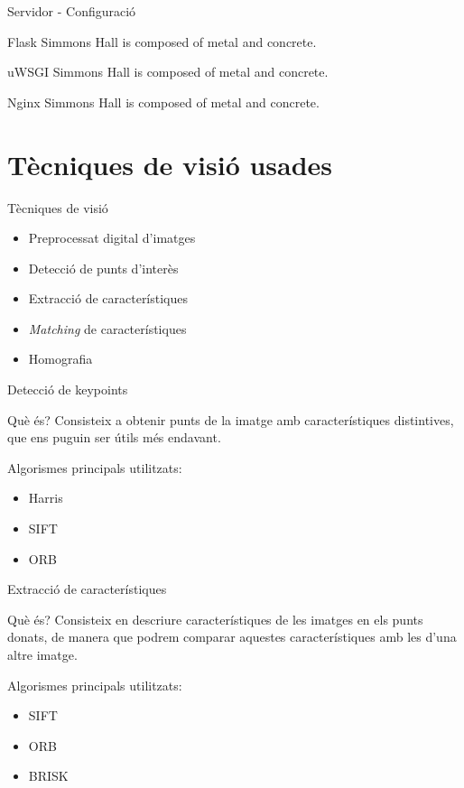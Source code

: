 \documentclass[xcolor=table, 11pt]{beamer}
\newcommand\tz{\fontsize{13}{15.6}\selectfont}
\begin{document}
	\begin{frame}{Servidor - Configuració}
		\tz
		\begin{alertblock}{Flask}
			Simmons Hall is composed of metal and concrete.
		\end{alertblock}
		\begin{alertblock}{uWSGI}
			Simmons Hall is composed of metal and concrete.
		\end{alertblock}
		\begin{alertblock}{Nginx}
			Simmons Hall is composed of metal and concrete.
		\end{alertblock}
	\end{frame}

\section{Tècniques de visió usades}

	\begin{frame}{Tècniques de visió}
		\tz
		\begin{itemize}
			\item Preprocessat digital d'imatges
			\item Detecció de punts d'interès
			\item Extracció de característiques
			\item \textit{Matching} de característiques
			\item Homografia
		\end{itemize}
	\end{frame}

	\begin{frame}{Detecció de keypoints}
		\tz
		\begin{block}{Què és?}
			Consisteix a obtenir punts de la imatge amb característiques distintives, que ens puguin ser útils més endavant.
		\end{block}
		Algorismes principals utilitzats:
		\begin{itemize}
			\item Harris\cite{Harris}
			\item SIFT\cite{SIFT}
			\item ORB\cite{Rublee:2011:OEA:2355573.2356268}
		\end{itemize}
	\end{frame}

	\begin{frame}{Extracció de característiques}
		\tz
		\begin{block}{Què és?}
			Consisteix en descriure característiques de les imatges en els punts donats, de manera que podrem comparar aquestes característiques amb les d'una altre imatge.
		\end{block}
		Algorismes principals utilitzats:
		\begin{itemize}
			\item SIFT
			\item ORB
			\item BRISK\cite{Leutenegger:2011:BBR:2355573.2356277}
		\end{itemize}
	\end{frame}
\end{document}
